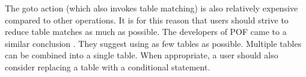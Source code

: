 The goto action (which also invokes table matching) is also relatively expensive compared to other operations. It is for this reason that users should strive to reduce table matches as much as possible. The developers of POF came to a similar conclusion \cite{pof_impl}. They suggest using as few tables as possible. Multiple tables can be combined into a single table. When appropriate, a user should also consider replacing a table with a conditional statement.
